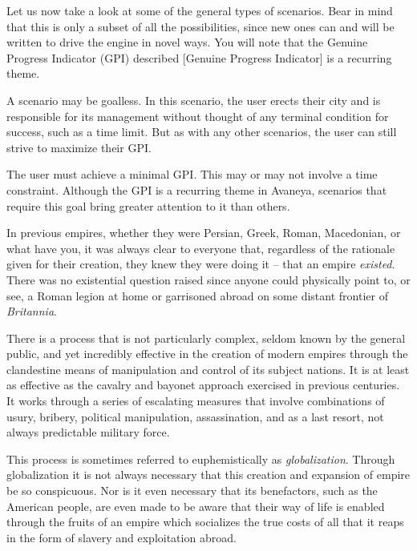 Let us now take a look at some of the general types of scenarios. Bear in mind that this is only a subset of all the possibilities, since new ones can and will be written to drive the engine in novel ways. You will note that the Genuine Progress Indicator (GPI) described [Genuine Progress Indicator] is a recurring theme.


A scenario may be goalless. In this scenario, the user erects their city and is responsible for its management without thought of any terminal condition for success, such as a time limit. But as with any other scenarios, the user can still strive to maximize their GPI.


The user must achieve a minimal GPI. This may or may not involve a time constraint. Although the GPI is a recurring theme in Avaneya, scenarios that require this goal bring greater attention to it than others.




In previous empires, whether they were Persian, Greek, Roman, Macedonian, or what have you, it was always clear to everyone that, regardless of the rationale given for their creation, they knew they were doing it -- that an empire {\it existed}. There was no existential question raised since anyone could physically point to, or see, a Roman legion at home or garrisoned abroad on some distant frontier of {\it Britannia}. 

There is a process that is not particularly complex, seldom known by the general public, and yet incredibly effective in the creation of modern empires through the clandestine means of manipulation and control of its subject nations. It is at least as effective as the cavalry and bayonet approach exercised in previous centuries. It works through a series of escalating measures that involve combinations of usury, bribery, political manipulation, assassination, and as a last resort, not always predictable military force. 

This process is sometimes referred to euphemistically as {\it globalization}. Through globalization it is not always necessary that this creation and expansion of empire be so conspicuous. Nor is it even necessary that its benefactors, such as the American people, are even made to be aware that their way of life is enabled through the fruits of an empire which socializes the true costs of all that it reaps in the form of slavery and exploitation abroad.

